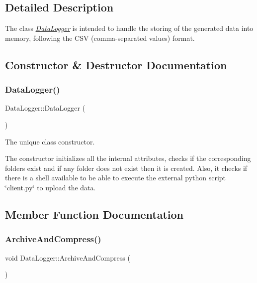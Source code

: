 \subsection{Detailed Description}
The class {\itshape \hyperlink{classDataLogger}{Data\+Logger}} is intended to handle the storing of the generated data into memory, following the C\+SV (comma-\/separated values) format. 

\subsection{Constructor \& Destructor Documentation}
\mbox{\label{classDataLogger_a7abebacd4747644d22982f9676466bad}} 
\subsubsection{\texorpdfstring{Data\+Logger()}{DataLogger()}}
{\footnotesize\ttfamily Data\+Logger\+::\+Data\+Logger (\begin{DoxyParamCaption}{ }\end{DoxyParamCaption})}



The unique class constructor. 

The constructor initializes all the internal attributes, checks if the corresponding folders exist and if any folder does not exist then it is created. Also, it checks if there is a shell available to be able to execute the external python script \char`\"{}client.\+py\char`\"{} to upload the data. 

\subsection{Member Function Documentation}
\mbox{\label{classDataLogger_a147fb7eaee1c38bbf57ef2d6cddf70d5}} 
\subsubsection{\texorpdfstring{Archive\+And\+Compress()}{ArchiveAndCompress()}}
{\footnotesize\ttfamily void Data\+Logger\+::\+Archive\+And\+Compress (\begin{DoxyParamCaption}{ }\end{DoxyParamCaption})}




